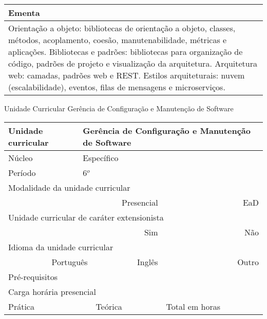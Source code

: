 \begin{quadro}[ht!]
\begin{tabular}{|p{3cm} p{2cm} p{3cm} p{2cm} p{3cm} p{2cm}|}
\multicolumn{6}{|p{15cm}|}{\cellcolor{blue1} Ementa} \\\hline
\hline\multicolumn{6}{|p{15cm}|}{\scriptsize Orientação a objeto: bibliotecas de orientação a objeto, classes, métodos, acoplamento, coesão, manutenabilidade, métricas e aplicações. Bibliotecas e padrões: bibliotecas para organização de código, padrões de projeto e visualização da arquitetura. Arquitetura web: camadas, padrões web e REST. Estilos arquiteturais: nuvem (escalabilidade), eventos, filas de mensagens e microserviços. }\\\hline 
\hline
	\end{tabular}
\end{quadro}


\begin{quadro}[ht!]
  \centering\scriptsize
\caption{Unidade Curricular Gerência de Configuração e Manutenção de Software}
\begin{tabular}{|p{3cm} p{2cm} p{3cm} p{2cm} p{3cm} p{2cm}|}\hline
\multicolumn{1}{|p{3cm}|}{\cellcolor{blue1} Unidade curricular} & \multicolumn{5}{p{9cm}|}{Gerência de Configuração e Manutenção de Software}\\\hline
\multicolumn{1}{|p{3cm}|}{\cellcolor{blue1} Núcleo} & \multicolumn{5}{p{11.5cm}|}{Específico}\\\hline
\multicolumn{1}{|p{3cm}|}{\cellcolor{blue1} Período} & \multicolumn{5}{p{9cm}|}{6$^o$}\\\hline
\multicolumn{6}{|p{15cm}|}{\cellcolor{blue1} Modalidade da unidade curricular} \\\hline
\multicolumn{2}{|r}{		} &  \multicolumn{2}{r}{Presencial \XBox} & \multicolumn{2}{r|}{EaD \Square	} \\\hline
\multicolumn{6}{|p{15cm}|}{\cellcolor{blue1} Unidade curricular de caráter extensionista} \\\hline
\multicolumn{4}{|r}{			Sim \XBox	} & \multicolumn{2}{r|}{	Não \Square	}\\\hline
\multicolumn{6}{|p{15cm}|}{\cellcolor{blue1} Idioma da unidade curricular} \\ \hline
\multicolumn{2}{|r}{	Português \XBox	} &  \multicolumn{2}{r}{	Inglês \Square	} & \multicolumn{2}{r|}{	Outro \Square	} \\ \hline
\multicolumn{1}{|p{3cm}|}{\cellcolor{blue1} Pré-requisitos} & \multicolumn{5}{p{9cm}|}{}\\ \hline
\multicolumn{6}{|p{15cm}|}{\cellcolor{blue1} Carga horária presencial} \\ \hline
\multicolumn{1}{|p{3cm}|}{\raggedleft Prática} & \multicolumn{1}{p{1cm}|}{\centering	30	} &  \multicolumn{1}{p{3cm}|}{\raggedleft Teórica}  & \multicolumn{1}{p{1cm}|}{\centering 	30	} & \multicolumn{1}{p{3cm}|}{\raggedleft Total em horas} & \multicolumn{1}{p{1cm}|}{\raggedleft	60	} \\ \hline 

\end{tabular}
\end{quadro}
